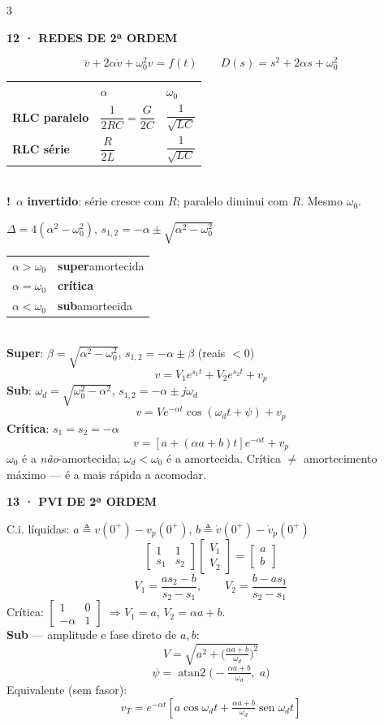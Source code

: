 \documentclass[10pt,a4paper]{article}
\newcommand{\sect}[1]{\vspace{1.2mm}{\color{acc}\rule{\linewidth}{0.9pt}}\vspace{-0.3mm}\par
  {\footnotesize\bfseries\color{acc}\MakeUppercase{#1}}\par\vspace{0.6mm}}
\newcommand{\sub}[1]{\vspace{0.8mm}{\bfseries #1}\par\vspace{0.3mm}}
\newcommand{\warn}[1]{{\color{amb}\textbf{!}~#1}\par\vspace{0.4mm}}
\newcommand{\note}[1]{{\color{gry}#1}\par\vspace{0.4mm}}
\newcommand{\cip}{0^{+}}
\begin{document}
\begin{multicols}{3}
\sect{12 · Redes de 2ª ordem}
\[\ddot v+2\alpha\dot v+\omega_0^2 v=f(t)\qquad D(s)=s^2+2\alpha s+\omega_0^2\]
\begin{tabular}{@{}l@{\;\;}l@{\;\;}l@{}}
 & $\alpha$ & $\omega_0$\\
\textbf{RLC paralelo} & $\dfrac{1}{2RC}=\dfrac{G}{2C}$ & $\dfrac{1}{\sqrt{LC}}$\\[1mm]
\textbf{RLC série} & $\dfrac{R}{2L}$ & $\dfrac{1}{\sqrt{LC}}$\\
\end{tabular}\\[0.6mm]
\warn{$\alpha$ \textbf{invertido}: série cresce com $R$; paralelo diminui com $R$. Mesmo $\omega_0$.}
$\Delta=4(\alpha^2-\omega_0^2)$,\; $s_{1,2}=-\alpha\pm\sqrt{\alpha^2-\omega_0^2}$

\sub{Os três regimes}
\begin{tabular}{@{}l@{\;}l@{}}
$\alpha>\omega_0$ & \textbf{super}amortecida\\
$\alpha=\omega_0$ & \textbf{crítica}\\
$\alpha<\omega_0$ & \textbf{sub}amortecida\\
\end{tabular}\\[0.8mm]
\textbf{Super}: $\beta=\sqrt{\alpha^2-\omega_0^2}$, $s_{1,2}=-\alpha\pm\beta$ (reais $<0$)
\[v=V_1e^{s_1t}+V_2e^{s_2t}+v_p\]
\textbf{Sub}: $\omega_d=\sqrt{\omega_0^2-\alpha^2}$, $s_{1,2}=-\alpha\pm j\omega_d$
\[v=Ve^{-\alpha t}\cos(\omega_dt+\psi)+v_p\]
\textbf{Crítica}: $s_1=s_2=-\alpha$
\[v=[a+(\alpha a+b)t]e^{-\alpha t}+v_p\]
\note{$\omega_0$ é a \emph{não}-amortecida; $\omega_d<\omega_0$ é a amortecida. Crítica $\ne$ amortecimento máximo — é a mais rápida a acomodar.}

\sect{13 · PVI de 2ª ordem}
C.i. líquidas: $a\triangleq v(\cip)-v_p(\cip)$,\; $b\triangleq\dot v(\cip)-\dot v_p(\cip)$
\[\begin{bmatrix}1&1\\ s_1&s_2\end{bmatrix}\!\begin{bmatrix}V_1\\V_2\end{bmatrix}=\begin{bmatrix}a\\b\end{bmatrix}\]
\[V_1=\frac{as_2-b}{s_2-s_1},\qquad V_2=\frac{b-as_1}{s_2-s_1}\]
Crítica: $\begin{bmatrix}1&0\\-\alpha&1\end{bmatrix}$ $\Rightarrow V_1=a$, $V_2=\alpha a+b$.\\[0.6mm]
\textbf{Sub} — amplitude e fase direto de $a,b$:
\[V=\sqrt{a^2+\Big(\tfrac{\alpha a+b}{\omega_d}\Big)^{2}}\]
\[\psi=\operatorname{atan2}\!\Big(\!-\tfrac{\alpha a+b}{\omega_d},\;a\Big)\]
Equivalente (sem fasor):
\[v_T=e^{-\alpha t}\!\left[a\cos\omega_dt+\tfrac{\alpha a+b}{\omega_d}\operatorname{sen}\omega_dt\right]\]


\end{multicols}
\end{document}
